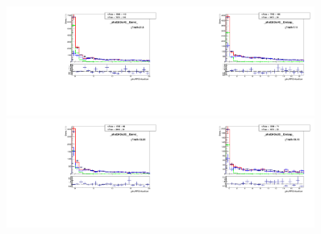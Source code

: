 \begin{figure}[htb]
  \begin{center}
   \includegraphics[width=0.45\textwidth]{../figs/figs_v11/MUON_WGamma/TemplateFits/c_TEMPL_CHISO_UNblind__phoEt35to45__Barrel__RooFit.pdf}\includegraphics[width=0.45\textwidth]{../figs/figs_v11/MUON_WGamma/TemplateFits/c_TEMPL_CHISO_UNblind__phoEt35to45__Endcap__RooFit.pdf}\\
   \includegraphics[width=0.45\textwidth]{../figs/figs_v11/MUON_WGamma/TemplateFits/c_TEMPL_CHISO_UNblind__phoEt45to55__Barrel__RooFit.pdf}\includegraphics[width=0.45\textwidth]{../figs/figs_v11/MUON_WGamma/TemplateFits/c_TEMPL_CHISO_UNblind__phoEt45to55__Endcap__RooFit.pdf}\\

\end{center}
\end{figure}
